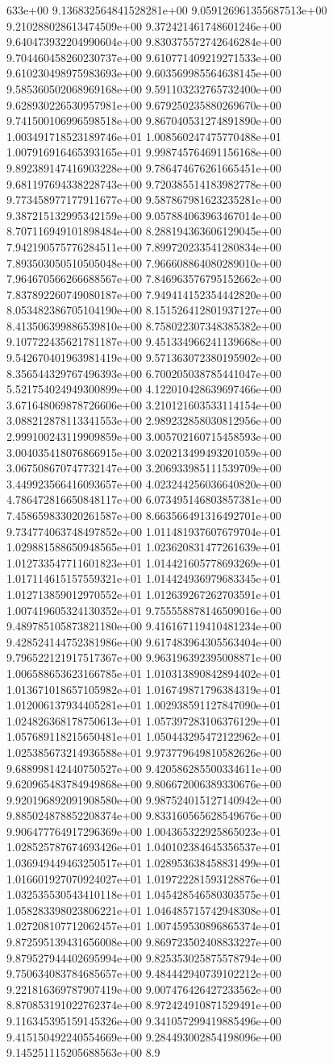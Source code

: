 633e+00	9.136832564841528281e+00	9.059126961355687513e+00	9.210288028613474509e+00	9.372421461748601246e+00	9.640473932204990604e+00	9.830375572742646284e+00	9.704460458260230737e+00	9.610771409219271533e+00	9.610230498975983693e+00	9.603569985564638145e+00	9.585360502068969168e+00	9.591103232765732400e+00	9.628930226530957981e+00	9.679250235880269670e+00	9.741500106996598518e+00	9.867040531274891890e+00	1.003491718523189746e+01	1.008560247475770488e+01	1.007916916465393165e+01	9.998745764691156168e+00	9.892389147416903228e+00	9.786474676261665451e+00	9.681197694338228743e+00	9.720385514183982778e+00	9.773458977177911677e+00	9.587867981623235281e+00	9.387215132995342159e+00	9.057884063963467014e+00	8.707116949101898484e+00	8.288194363606129045e+00	7.942190575776284511e+00	7.899720233541280834e+00	7.893503050510505048e+00	7.966608864080289010e+00	7.964670566266688567e+00	7.846963576795152662e+00	7.837892260749080187e+00	7.949414152354442820e+00	8.053482386705104190e+00	8.151526412801937127e+00	8.413506399886539810e+00	8.758022307348385382e+00	9.107722435621781187e+00	9.451334966241139668e+00	9.542670401963981419e+00	9.571363072380195902e+00	8.356544329767496393e+00	6.700205038785441047e+00	5.521754024949300899e+00	4.122010428639697466e+00	3.671648069878726606e+00	3.210121603533114154e+00	3.088212878113341553e+00	2.989232858030812956e+00	2.999100243119909859e+00	3.005702160715458593e+00	3.004035418076866915e+00	3.020213499493201059e+00	3.067508670747732147e+00	3.206933985111539709e+00	3.449923566416093657e+00	4.023244256036640820e+00	4.786472816650848117e+00	6.073495146803857381e+00	7.458659833020261587e+00	8.663566491316492701e+00	9.734774063748497852e+00	1.011481937607679704e+01	1.029881588650948565e+01	1.023620831477261639e+01	1.012733547711601823e+01	1.014421605778693269e+01	1.017114615157559321e+01	1.014424936979683345e+01	1.012713859012970552e+01	1.012639267262703591e+01	1.007419605324130352e+01	9.755558878146509016e+00	9.489785105873821180e+00	9.416167119410481234e+00	9.428524144752381986e+00	9.617483964305563404e+00	9.796522121917517367e+00	9.963196392395008871e+00	1.006588653623166785e+01	1.010313890842894402e+01	1.013671018657105982e+01	1.016749871796384319e+01	1.012006137934405281e+01	1.002938591127847090e+01	1.024826368178750613e+01	1.057397283106376129e+01	1.057689118215650481e+01	1.050443295472122962e+01	1.025385673214936588e+01	9.973779649810582626e+00	9.688998142440750527e+00	9.420586285500334611e+00	9.620965483784949868e+00	9.806672006389330676e+00	9.920196892091908580e+00	9.987524015127140942e+00	9.885024878852208374e+00	9.833160565628549676e+00	9.906477764917296369e+00	1.004365322925865023e+01	1.028525787674693426e+01	1.040102384645356537e+01	1.036949449463250517e+01	1.028953638458831499e+01	1.016601927070924027e+01	1.019722281593128876e+01	1.032535530543410118e+01	1.045428546580303575e+01	1.058283398023806221e+01	1.046485715742948308e+01	1.027208107712062457e+01	1.007459530896865374e+01	9.872595139431656008e+00	9.869723502408833227e+00	9.879527944402695994e+00	9.825353025875578794e+00	9.750634083784685657e+00	9.484442940739102212e+00	9.221816369787907419e+00	9.007476426427233562e+00	8.870853191022762374e+00	8.972424910871529491e+00	9.116345395159145326e+00	9.341057299419885496e+00	9.415150492240554669e+00	9.284493002854198096e+00	9.145251115205688563e+00	8.9